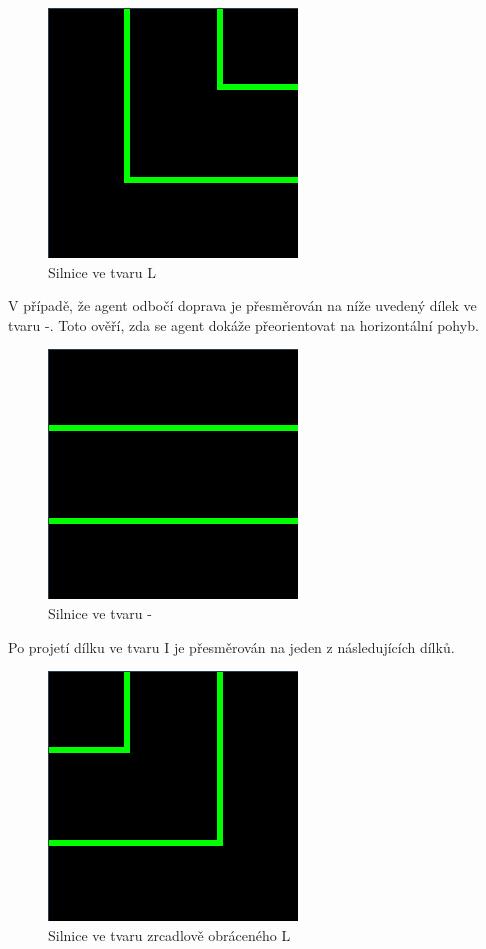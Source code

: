 \begin{figure}[H]
	\centering
	\includegraphics[scale=0.6]{pieces/L}
	\caption{Silnice ve tvaru L}
	\label{fig:l}
\end{figure}
V případě, že agent odbočí doprava je přesměrován na níže uvedený dílek ve tvaru -. Toto ověří, zda se agent dokáže přeorientovat na horizontální pohyb.
\begin{figure}[H]
	\centering
	\includegraphics[scale=0.6]{pieces/-}
	\caption{Silnice ve tvaru -}
	\label{fig:-}
\end{figure}
Po projetí dílku ve tvaru I je přesměrován na jeden z následujících dílků.
\begin{figure}[H]
	\centering
	\includegraphics[scale=0.6]{pieces/inverted_L}
	\caption{Silnice ve tvaru zrcadlově obráceného L}
	\label{fig:invertedl}
\end{figure}
